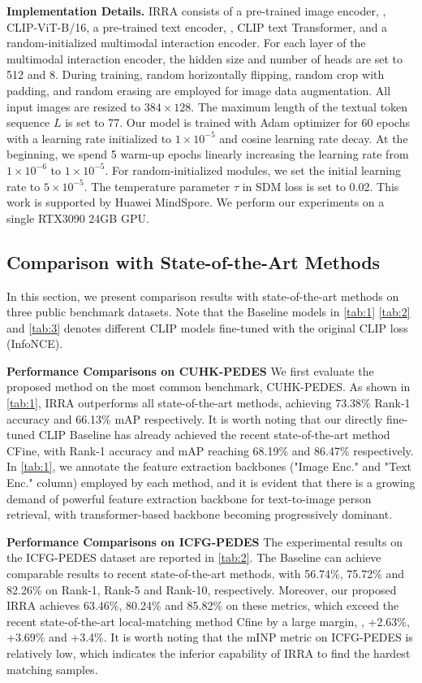 \documentclass[10pt,twocolumn,letterpaper]{article}
\begin{document}
\textbf{Implementation Details.} IRRA consists of a pre-trained image encoder, \ie, CLIP-ViT-B/16, a pre-trained text encoder, \ie, CLIP text Transformer, and a random-initialized multimodal interaction encoder. For each layer of the multimodal interaction encoder, the hidden size and number of heads are set to 512 and 8. During training, random horizontally flipping, random crop with padding, and random erasing are employed for image data augmentation. All input images are resized to $384 \times 128$. The maximum length of the textual token sequence $L$ is set to 77. Our model is trained with Adam optimizer\cite{kingma2015adam} for 60 epochs with a learning rate initialized to $1 \times 10^{-5}$ and  cosine learning rate decay. At the beginning, we spend 5 warm-up epochs linearly increasing the learning rate from $1 \times 10^{-6}$ to $1 \times 10^{-5}$. For random-initialized modules, we set the initial learning rate to $5 \times 10^{-5}$. The temperature parameter $\tau$ in SDM loss is set to 0.02. This work is supported by Huawei MindSpore\cite{mindspore}. We perform our experiments on a single RTX3090 24GB GPU.

\subsection{Comparison with State-of-the-Art Methods}
In this section, we present comparison results with state-of-the-art methods on three public benchmark datasets.
Note that the Baseline models in \cref{tab:1} \ref{tab:2} and \ref{tab:3} denotes different CLIP models fine-tuned with the original CLIP loss (InfoNCE\cite{oord2018representation}).

\textbf{Performance Comparisons on CUHK-PEDES}
We first evaluate the proposed method on the most common benchmark, CUHK-PEDES. As shown in \cref{tab:1}, IRRA outperforms all state-of-the-art methods, achieving 73.38\% Rank-1 accuracy and 66.13\% mAP respectively. It is worth noting that our directly fine-tuned CLIP Baseline has already achieved the recent state-of-the-art method CFine\cite{yan2022clip}, with Rank-1 accuracy and mAP reaching 68.19\% and 86.47\% respectively.
In \cref{tab:1}, we annotate the feature extraction backbones ("Image Enc." and "Text Enc." column) employed by each method, and it is evident that there is a  growing demand of powerful feature extraction backbone for text-to-image person retrieval, with transformer-based backbone becoming progressively dominant. 

\textbf{Performance Comparisons on ICFG-PEDES}
The experimental results on the ICFG-PEDES dataset are reported in \cref{tab:2}. The Baseline can achieve comparable results to recent state-of-the-art methods, with 56.74\%, 75.72\% and 82.26\% on Rank-1, Rank-5 and Rank-10, respectively. Moreover, our proposed IRRA achieves 63.46\%, 80.24\% and 85.82\% on these metrics, which exceed the recent state-of-the-art local-matching method Cfine\cite{yan2022clip} by a large margin, \ie, +2.63\%, +3.69\% and +3.4\%. It is worth noting that the mINP\cite{ye2021deep} metric on ICFG-PEDES is relatively low, which indicates the inferior capability of IRRA to find the hardest matching samples.
\end{document}
